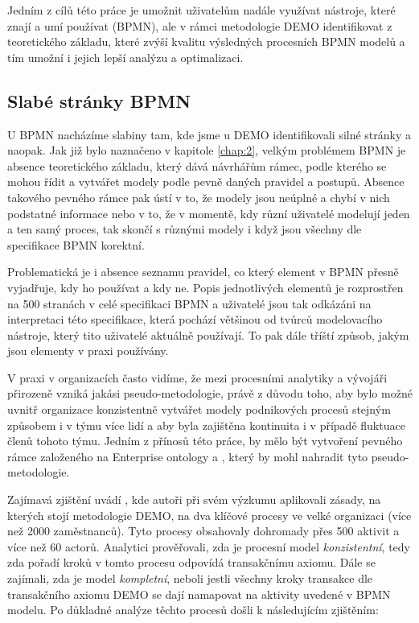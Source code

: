 Jedním z cílů této práce je umožnit uživatelům nadále využívat nástroje, které znají a umí používat (BPMN), ale v rámci metodologie DEMO identifikovat  z teoretického základu, které zvýší kvalitu výsledných procesních BPMN modelů a tím umožní i jejich lepší analýzu a optimalizaci.

\subsection{Slabé stránky BPMN}
U BPMN nacházíme slabiny tam, kde jsme u DEMO identifikovali silné stránky a naopak. Jak již bylo naznačeno v kapitole \ref{chap:2}, velkým problémem BPMN je absence teoretického základu, který dává návrhářům rámec, podle kterého se mohou řídit a vytvářet modely podle pevně daných pravidel a postupů. Absence takového pevného rámce pak ústí v to, že modely jsou neúplné a chybí v nich podstatné informace nebo v to, že v momentě, kdy různí uživatelé modelují jeden a ten samý proces, tak skončí s různými modely i když jsou všechny dle specifikace BPMN korektní.

Problematická je i absence seznamu pravidel, co který element v BPMN přesně vyjadřuje, kdy ho používat a kdy ne. Popis jednotlivých elementů je rozprostřen na 500 stranách v celé specifikaci BPMN \cite{Silver2011} a uživatelé jsou tak odkázáni na interpretaci této specifikace, která pochází většinou od tvůrců modelovacího nástroje, který tito uživatelé aktuálně používají. To pak dále tříští způsob, jakým jsou elementy v praxi používány.

V praxi v organizacích často vidíme, že mezi procesními analytiky a vývojáři přirozeně vzniká jakási pseudo-metodologie, právě z důvodu toho, aby bylo možné uvnitř organizace konzistentně vytvářet modely podnikových procesů stejným způsobem i v týmu více lidí a aby byla zajištěna kontinuita i v případě fluktuace členů tohoto týmu. Jedním z přínosů této práce, by mělo být vytvoření pevného rámce založeného na Enterprise ontology a \ptheory{}, který by mohl nahradit tyto pseudo-metodologie.

Zajímavá zjištění uvádí \cite{Caetano2012}, kde autoři při svém výzkumu aplikovali zásady, na kterých stojí metodologie DEMO, na dva klíčové procesy ve velké organizaci (více než 2000 zaměstnanců). Tyto procesy obsahovaly dohromady přes 500 aktivit a více než 60 actorů. Analytici prověřovali, zda je procesní model \textit{konzistentní}, tedy zda pořadí kroků v tomto procesu odpovídá transakčnímu axiomu. Dále se zajímali, zda je model \textit{kompletní}, neboli jestli všechny kroky transakce dle transakčního axiomu DEMO se dají namapovat na aktivity uvedené v BPMN modelu. Po důkladné analýze těchto procesů došli k následujícím zjištěním:

